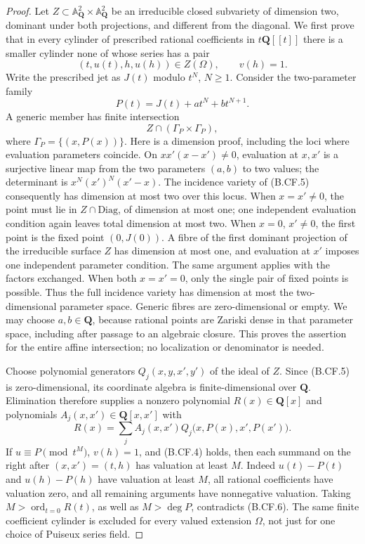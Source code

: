 \documentclass[11pt,a4paper]{article}
\newcommand{\Q}{\mathbf Q}
\begin{document}
\begin{proof}
Let \(Z\subset\mathbb A^2_{\Q}\times\mathbb A^2_{\Q}\) be an
irreducible closed subvariety of dimension two, dominant under both
projections, and different from the diagonal. We first prove that
in every cylinder of prescribed rational coefficients in \(t\Q[[t]]\)
there is a smaller cylinder none of whose series has a pair
\[
                 (t,u(t),h,u(h))\in Z(\Omega),\qquad v(h)=1.
                                                        \tag{B.CF.4}
\]
Write the prescribed jet as \(J(t)\) modulo \(t^N\), \(N\geq1\).
Consider the two-parameter family
\[
                       P(t)=J(t)+a t^N+b t^{N+1}.
\]
A generic member has finite intersection
\[
                         Z\cap(\Gamma_P\times\Gamma_P), 
                                                        \tag{B.CF.5}
\]
where \(\Gamma_P=\{(x,P(x))\}\). Here is a dimension proof, including
the loci where evaluation parameters coincide. On
\(xx'(x-x')\ne0\), evaluation at \(x,x'\) is a surjective linear
map from the two parameters \((a,b)\) to two values; the determinant
is \(x^N(x')^N(x'-x)\). The incidence variety of (B.CF.5) consequently
has dimension at most two over this locus. When \(x=x'\ne0\), the
point must lie in \(Z\cap\mathrm{Diag}\), of dimension at most one;
one independent evaluation condition again leaves total dimension at
most two. When \(x=0\), \(x'\ne0\), the first point is the fixed
point \((0,J(0))\). A fibre of the first dominant projection of the
irreducible surface \(Z\) has dimension at most one, and evaluation
at \(x'\) imposes one independent parameter condition. The same
argument applies with the factors exchanged. When both \(x=x'=0\),
only the single pair of fixed points is possible. Thus the full
incidence variety has dimension at most the two-dimensional parameter
space. Generic fibres are zero-dimensional or empty. We may choose
\(a,b\in\Q\), because rational points are Zariski dense in that
parameter space, including after passage to an algebraic closure.
This proves the assertion for the entire affine intersection; no
localization or denominator is needed.

Choose polynomial generators \(Q_j(x,y,x',y')\) of the ideal of
\(Z\). Since (B.CF.5) is zero-dimensional, its coordinate algebra is
finite-dimensional over \(\Q\). Elimination therefore supplies a
nonzero polynomial \(R(x)\in\Q[x]\) and polynomials
\(A_j(x,x')\in\Q[x,x']\) with
\[
 R(x)=\sum_j A_j(x,x')Q_j\bigl(x,P(x),x',P(x')\bigr).
                                                        \tag{B.CF.6}
\]
If \(u\equiv P\pmod{t^M}\), \(v(h)=1\), and (B.CF.4) holds,
then each summand on the right after \((x,x')=(t,h)\) has valuation
at least \(M\). Indeed \(u(t)-P(t)\) and \(u(h)-P(h)\) have
valuation at least \(M\), all rational coefficients have valuation
zero, and all remaining arguments have nonnegative valuation.
Taking \(M>\operatorname{ord}_{t=0}R(t)\), as well as
\(M>\deg P\), contradicts (B.CF.6). The same finite coefficient
cylinder is excluded for every valued extension \(\Omega\), not
just for one choice of Puiseux series field.


\end{proof}
\end{document}
